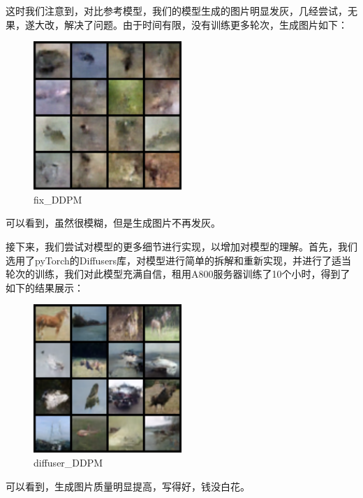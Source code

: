 \documentclass{ctexart}
\begin{document}
这时我们注意到，对比参考模型，我们的模型生成的图片明显发灰，几经尝试，无果，遂大改，解决了问题。由于时间有限，没有训练更多轮次，生成图片如下：
\begin{figure}[H]
     \centering
     \includegraphics[width=0.5\textwidth]{sample_fix.png}
     \caption{fix\_DDPM}
     \label{fig:fix_ddpm}  %
\end{figure}

可以看到，虽然很模糊，但是生成图片不再发灰。

接下来，我们尝试对模型的更多细节进行实现，以增加对模型的理解。首先，我们选用了pyTorch的Diffusers库，对模型进行简单的拆解和重新实现，并进行了适当轮次的训练，我们对此模型充满自信，租用A800服务器训练了10个小时，得到了如下的结果展示：
\begin{figure}[H]
     \centering
     \includegraphics[width=0.5\textwidth]{sample_diffuser.png}
     \caption{diffuser\_DDPM}
     \label{fig:diffuser_ddpm}  %
\end{figure}


可以看到，生成图片质量明显提高，写得好，钱没白花。
\end{document}
